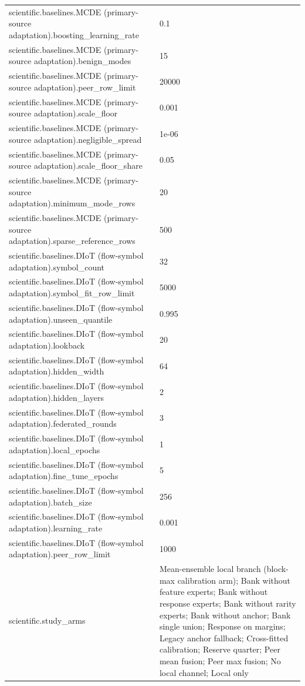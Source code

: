 \begin{tabular}{ll}
scientific.baselines.MCDE (primary-source adaptation).boosting\_learning\_rate & 0.1 \\
scientific.baselines.MCDE (primary-source adaptation).benign\_modes & 15 \\
scientific.baselines.MCDE (primary-source adaptation).peer\_row\_limit & 20000 \\
scientific.baselines.MCDE (primary-source adaptation).scale\_floor & 0.001 \\
scientific.baselines.MCDE (primary-source adaptation).negligible\_spread & 1e-06 \\
scientific.baselines.MCDE (primary-source adaptation).scale\_floor\_share & 0.05 \\
scientific.baselines.MCDE (primary-source adaptation).minimum\_mode\_rows & 20 \\
scientific.baselines.MCDE (primary-source adaptation).sparse\_reference\_rows & 500 \\
scientific.baselines.DIoT (flow-symbol adaptation).symbol\_count & 32 \\
scientific.baselines.DIoT (flow-symbol adaptation).symbol\_fit\_row\_limit & 5000 \\
scientific.baselines.DIoT (flow-symbol adaptation).unseen\_quantile & 0.995 \\
scientific.baselines.DIoT (flow-symbol adaptation).lookback & 20 \\
scientific.baselines.DIoT (flow-symbol adaptation).hidden\_width & 64 \\
scientific.baselines.DIoT (flow-symbol adaptation).hidden\_layers & 2 \\
scientific.baselines.DIoT (flow-symbol adaptation).federated\_rounds & 3 \\
scientific.baselines.DIoT (flow-symbol adaptation).local\_epochs & 1 \\
scientific.baselines.DIoT (flow-symbol adaptation).fine\_tune\_epochs & 5 \\
scientific.baselines.DIoT (flow-symbol adaptation).batch\_size & 256 \\
scientific.baselines.DIoT (flow-symbol adaptation).learning\_rate & 0.001 \\
scientific.baselines.DIoT (flow-symbol adaptation).peer\_row\_limit & 1000 \\
scientific.study\_arms & Mean-ensemble local branch (block-max calibration arm); Bank without feature experts; Bank without response experts; Bank without rarity experts; Bank without anchor; Bank single union; Response on margins; Legacy anchor fallback; Cross-fitted calibration; Reserve quarter; Peer mean fusion; Peer max fusion; No local channel; Local only \\

\end{tabular}
